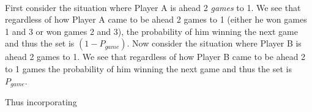 \documentclass[12pt]{article}
\begin{document}
\paragraph{} First consider the situation where Player A is ahead 2 \emph{games} to 1. We see that regardless of how Player A came to be ahead 2 games to 1 (either he won games 1 and 3 or won games 2 and 3), the probability of him winning the next game and thus the set is $(1-P_{game})$. Now consider the situation where Player B is ahead 2 games to 1. We see that regardless of how Player B came to be ahead 2 to 1 games the probability of him winning the next game and thus the set is $P_{game}$. 

Thus incorporating 


\end{document}
